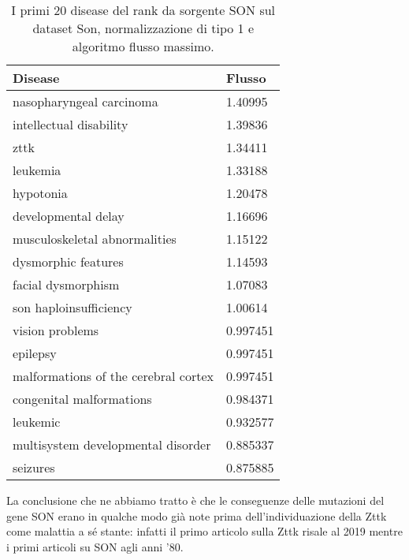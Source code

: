 \documentclass[12pt]{report}
\def\arraystretch{0.6}
\begin{document}
\def\arraystretch{0.6}
\begin{table}[!htb]
\centering
\begin{tabular}{|l|l|}
    \hline
    \textbf{Disease} & \textbf{Flusso}  \\
    \hline
    \small{nasopharyngeal carcinoma}         & \small{1.40995}\\
    \small{intellectual disability}           & \small{1.39836}\\
    \small{zttk}                                & \small{1.34411}\\
    \small{leukemia}                             & \small{1.33188}\\
    \small{hypotonia}                                 & \small{1.20478}\\
    \small{developmental delay}                       & \small{1.16696}\\
    \small{musculoskeletal abnormalities}            & \small{1.15122}\\
    \small{dysmorphic features}                      & \small{1.14593}\\
    \small{facial dysmorphism}                        & \small{1.07083}\\
    \small{son haploinsufficiency}                & \small{1.00614}\\
    \small{vision problems}                          & \small{0.997451}\\
    \small{epilepsy}                                   & \small{0.997451}\\
    \small{malformations of the cerebral cortex}       & \small{0.997451}\\
    \small{congenital malformations}                     & \small{0.984371}\\
    \small{leukemic}                                    & \small{0.932577}\\
    \small{multisystem developmental disorder}          & \small{0.885337}\\
    \small{seizures}                                    & \small{0.875885} \\
    \hline
\end{tabular}
\caption{\footnotesize{I primi 20 disease del rank da sorgente SON sul dataset Son, normalizzazione di tipo 1 e algoritmo flusso massimo.}}
\label{tab:disease_from_son}
\end{table}

La conclusione che ne abbiamo tratto è che le conseguenze delle mutazioni del gene SON erano in qualche modo già note prima dell'individuazione della Zttk come malattia a sé stante: infatti il primo articolo sulla Zttk risale al 2019 mentre i primi articoli su SON agli anni '80.
\end{document}
